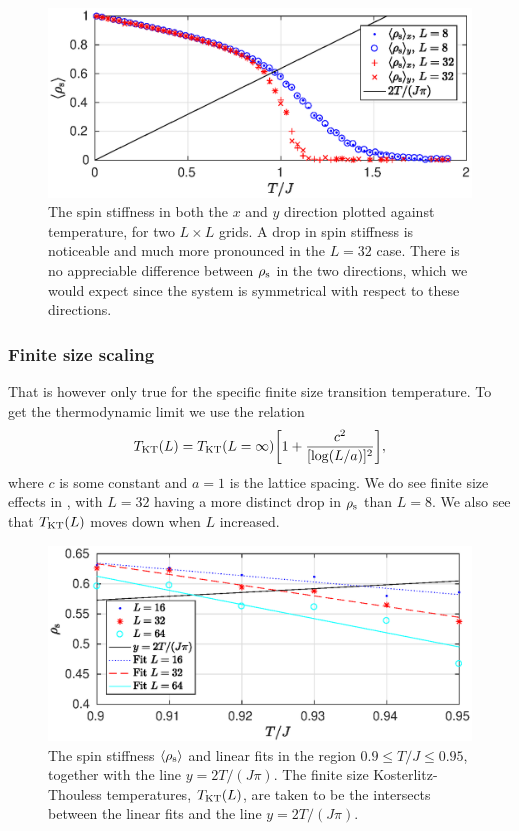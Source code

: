 \documentclass[11pt,letter, swedish, english
]{article}
\begin{document}
\begin{figure}
\centering
\includegraphics[width=1\textwidth]{XY_rhos_L-8-32_Nsteps-64.eps}
\caption{The spin stiffness in both the $x$ and $y$ direction plotted
  against temperature, for two $L\times L$ grids. A drop in spin
  stiffness is noticeable and much more pronounced in the $L=32$
  case. There is no appreciable difference between $\rho_{\text{s}}$ in the two
  directions, which we would expect since the system is symmetrical
  with respect to these directions.  } 
\label{fig:rhos1}
\end{figure}


\subsubsection{Finite size scaling}
That is however only true for the specific finite size transition
temperature. To get the thermodynamic limit we use the relation
\cite{Melko-etal2004} 
\begin{equation}\label{eq:TKT(L)}
T_{\text{KT}}(L) = T_{\text{KT}}(L=\infty)\qty[1+\frac{c^2}{[\log(L/a)]^2}],
\end{equation}
where $c$ is some constant and $a=1$ is the lattice spacing. We do see
finite size effects in , with $L=32$ having a more
distinct drop in $\rho_{\text{s}}$ than $L=8$. We also see that $T_{\text{KT}}(L)$ moves
down when $L$ increased.

\begin{figure}
\centering
\includegraphics[width=1\textwidth]{XY_rhos_L-16--64_near-TKT.eps}
\caption{The spin stiffness $\ev{\rhos}$ and linear fits in the region
  $0.9\le T/J \le0.95$, together with the line $y=2T/(J\pi)$. The
  finite size Kosterlitz-Thouless temperatures, $T_{\text{KT}}(L)$, are taken to
  be the intersects between the linear fits and the line
  $y=2T/(J\pi)$. } 
\label{fig:rhos2}
\end{figure}
\end{document}
